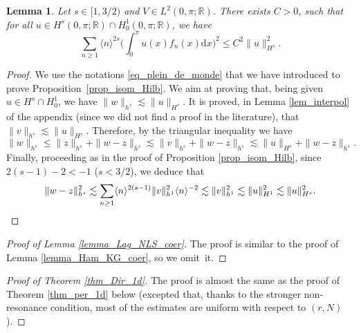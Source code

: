 \documentclass[JEP,XML,SOM,Unicode,NoEqCountersInSection,published]{cedram}
\newtheorem{lemma}[theorem]{Lemma}
\theoremstyle{definition}
\begin{document}
\begin{lemma}
\label{lem_inter_fn}
Let $s \in [1,3/2)$ and $V\in L^2(0,\pi;\mathbb{R})$. There exists $C>0$, such that for all $u\in H^{s}(0,\pi;\mathbb{R}) \cap H^1_0(0,\pi;\mathbb{R})$, we have
\[
\sum_{n\geq 1} \langle n \rangle^{2s} \biggl(\int_0^\pi u(x) f_n(x) \mathrm{d}x \biggr)^2 \leq C^2 \|u\|_{H^{s}}^2.
\]
\end{lemma}
\begin{proof} We use the notations \eqref{eq_plein_de_monde} that we have introduced to prove Proposition~\ref{prop_isom_Hilb}.
We aim at proving that, being given $u\in H^{s} \cap H^1_0$, we have $\| w\|_{h^{s}} \lesssim \| u \|_{H^s}$. It is proved, in Lemma \ref{lem_interpol} of the appendix (since we did not find a proof in the literature), that
$\| v \|_{h^s} \lesssim \| u\|_{H^s}$. Therefore, by the triangular inequality we have
\[
\| w\|_{h^{s}} \leq \| z \|_{h^{s}} + \|w - z \|_{h^{s}} \lesssim \| v \|_{h^{s}}+ \|w - z \|_{h^{s}} \lesssim \| u \|_{H^s} + \|w - z \|_{h^{s}}.
\]
Finally, proceeding as in the proof of Proposition \ref{prop_isom_Hilb}, since $2(s-1)-2<-1$ (\ie $s<3/2$), we deduce that
\[
\|w - z \|_{h^{s}}^2 \lesssim \sum_{n\geq 1} \langle n \rangle^{2(s-1)} \| v\|_{h^1}^2 \langle n \rangle^{-2} \lesssim \| v\|_{h^1}^2 \lesssim \| u\|_{H^1}^2 \lesssim \| u\|_{H^s}^2.\qedhere
\]
\end{proof}


\begin{proof}[Proof of Lemma \ref{lemma_Lag_NLS_coer}] The proof is similar to the proof of Lemma \ref{lemma_Ham_KG_coer}, so we omit~it.
\end{proof}

\begin{proof}[Proof of Theorem \ref{thm_Dir_1d}] The proof is almost the same as the proof of Theorem \ref{thm_per_1d} below (excepted that, thanks to the stronger non-resonance condition, most of the estimates are uniform with respect to $(r,N)$).
\end{proof}
\end{document}
